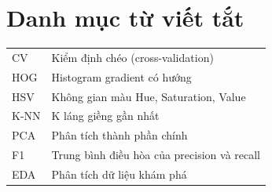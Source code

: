 \chapter*{Danh mục từ viết tắt}
\begin{tabular}{ll}CV & Kiểm định chéo (cross-validation)\\ HOG & Histogram gradient có hướng\\ HSV & Không gian màu Hue, Saturation, Value\\ K-NN & K láng giềng gần nhất\\ PCA & Phân tích thành phần chính\\ F1 & Trung bình điều hòa của precision và recall\\ EDA & Phân tích dữ liệu khám phá\end{tabular}
